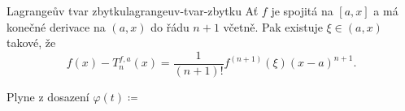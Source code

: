 \begin{corollary}{Lagrangeův tvar zbytku}{lagrangeuv-tvar-zbytku}
 Ať $f$ je spojitá na $[a,x]$ a má konečné derivace na $(a,x)$ do řádu $n+1$
 včetně. Pak existuje $\xi \in (a,x)$ takové, že
 \[
  f(x) - T^{f,a}_n(x) = \frac{1}{(n+1)!}f^{(n+1)}(\xi)(x-a)^{n+1}.
 \]
\end{corollary}
\begin{corproof}
 Plyne z dosazení $\varphi(t) \coloneqq $
\end{corproof}
